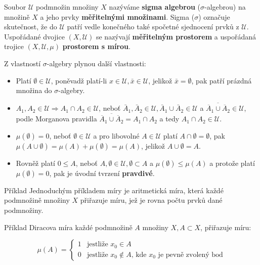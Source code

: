 	Soubor $\mathscr{U}$ podmnožin množiny $X$ nazýváme \textbf{sigma algebrou} ($\sigma$-algebrou) na množině $X$ a jeho prvky \textbf{měřitelnými množinami}. Sigma ($\sigma$) označuje skutečnost, že do $\mathscr{U}$ patří vedle konečného také spočetné sjednocení prvků z $\mathscr{U}$. Uspořádané dvojice $(X, \mathscr{U})$ se nazývají \textbf{měřitelným prostorem} a uspořádaná trojice $(X,\mathscr{U},\mu)$ \textbf{prostorem s mírou}.\br
	
	Z vlastností $\sigma$-algebry plynou další vlastnosti:
	\begin{itemize}
		\item Platí $\emptyset\in \mathscr{U}$, poněvadž platí-li $x\in \mathscr{U}, \bar{x}\in \mathscr{U}$, jelikož $\bar{x}=\emptyset$, pak patří prázdná množina do $\sigma$-algebry.
		\item $A_1,A_2\in \mathscr{U} \Rightarrow A_1\cap A_2\in \mathscr{U}$, neboť $\bar{A}_1, \bar{A}_2\in \mathscr{U}, \bar{A}_1\cup\bar{A}_2\in \mathscr{U}$ a $\overline{\overline{A}_1\cup\overline{A}_2}\in \mathscr{U}$, podle Morganova pravidla $\overline{\overline{A}_1\cup\overline{A}_2} = A_1\cap A_2$ a tedy $A_1\cap A_2\in \mathscr{U}$.
		\item $\mu(\emptyset)=0$, neboť $\emptyset\in \mathscr{U}$ a pro libovolné $A\in \mathscr{U}$ platí $A\cap\emptyset = \emptyset$, pak $\mu(A\cup \emptyset)=\mu(A)+\mu(\emptyset)=\mu(A)$, jelikož $A\cup \emptyset = A$.
		\item Rovněž platí $0\leq A$, neboť $A,\emptyset\in \mathscr{U}, \emptyset\subset A$ a $\mu(\emptyset)\leq\mu(A)$ a protože platí $\mu(\emptyset)=0$, pak je úvodní tvrzení \textbf{pravdivé}.
	\end{itemize}
	
	\begin{note}{Příklad}
	Jednoduchým příkladem míry je aritmetická míra, která každé podmnožině množiny $X$ přiřazuje míru, jež je rovna počtu prvků dané podmnožiny.
	\end{note}
	
	\begin{note}{Příklad}
	Diracova míra každé podmnožině $A$ množiny $X, A\subset X$, přiřazuje míru: 
	
	\[ \mu(A) = \begin{cases} 1& \text{jestliže } x_0\in A\\ 0 & \text{jestliže } x_0\not\in A\text{, kde $x_0$ je pevně zvolený bod}  \end{cases} \]
	\end{note}
	
